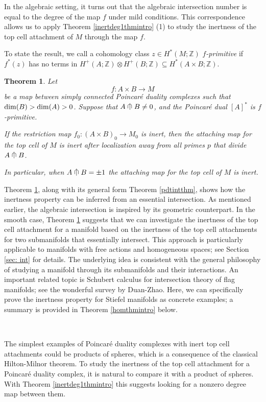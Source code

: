 \documentclass[a4]{amsart}
\newtheorem{theorem}{Theorem}[section]
\theoremstyle{definition}
\newcommand{\testcap}{\mathrel{\vcenter{\offinterlineskip
\hbox{$\cap$}\vskip-1.8ex\hbox{$\kern0.2em | \kern0.15em$}}}}
\begin{document}
\begin{sloppypar}
In the algebraic setting, it turns out that the algebraic intersection number is equal to the degree of the map $f$ under mild conditions. This correspondence allows us to apply Theorem \ref{inertdeg1thmintro} (1) to study the inertness of the top cell attachment of $M$ through the map $f$. 

To state the result, we call a cohomology class $z\in H^\ast(M;\mathbb{Z})$ {\it $f$-primitive} if $f^\ast(z)$ has no terms in $H^{+}(A;\mathbb{Z})\otimes H^{+}(B;\mathbb{Z})\subseteq H^{\ast}(A\times B;\mathbb{Z})$. 

 \begin{theorem}\label{pdtintthmintro}
Let 
\[
f: A\times B\stackrel{}{\longrightarrow} M
\]
be a map between simply connected Poincar\'{e} duality complexes such that ${\rm dim}(B)>{\rm dim}(A)>0$. 
Suppose that $A\testcap B\neq 0$, and the Poincar\'{e} dual $[A]^\ast$ is $f$-primitive. 

If the restriction map 
$
f_0: (A\times B)_0\stackrel{}{\longrightarrow} M_0
$ 
is inert, 
then the attaching map for the top cell of $M$ is inert after localization away from all primes $p$ that divide $A\testcap B$.

In particular, when $A\testcap B=\pm 1$ the attaching map for the top cell of $M$ is inert. 
\end{theorem}

Theorem \ref{pdtintthmintro}, along with its general form Theorem \ref{pdtintthm}, shows how the inertness property can be inferred from an essential intersection. As mentioned earlier, the algebraic intersection is inspired by its geometric counterpart. In the smooth case, Theorem \ref{pdtintthmintro} suggests that we can investigate the inertness of the top cell attachment for a manifold based on the inertness of the top cell attachments for two submanifolds that essentially intersect. This approach is particularly applicable to manifolds with free actions and homogeneous spaces; see Section \ref{sec: int} for details. 
The underlying idea is consistent with the general philosophy of studying a manifold through its submanifolds and their interactions. An important related topic is Schubert calculus for intersection theory of flag manifolds; see the wonderful survey \cite{DZ22} by Duan-Zhao. 
Here, we can specifically prove the inertness property for Stiefel manifolds as concrete examples; a summary is provided in Theorem \ref{homthmintro} below. 

$\, $

The simplest examples of Poincar\'{e} duality complexes with inert top cell attachments could be products of spheres, which is a consequence of the classical Hilton-Milnor theorem. To study the inertness of the top cell attachment for a Poincar\'{e} duality complex, it is natural to compare it with a product of spheres. With Theorem \ref{inertdeg1thmintro} this suggests looking for a nonzero degree map between them.   



\end{sloppypar}
\end{document}
